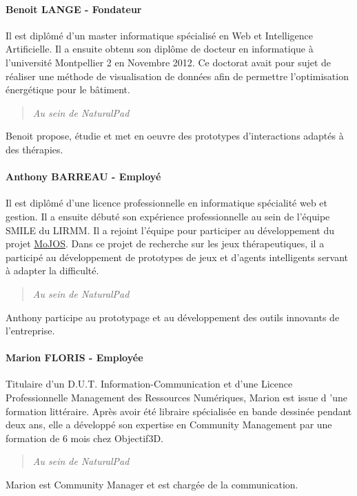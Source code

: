 		\paragraph{Benoit LANGE - Fondateur\\}
Il est diplômé d’un master informatique spécialisé en Web et Intelligence Artificielle. Il a ensuite obtenu son diplôme de docteur en informatique à l’université Montpellier 2 en Novembre 2012. Ce doctorat avait pour sujet de réaliser une méthode de visualisation de données afin de permettre l’optimisation énergétique pour le bâtiment. 
		\begin{quotation} \emph{Au sein de NaturalPad} \end{quotation}
Benoit propose, étudie et met en oeuvre des prototypes d’interactions adaptés à des thérapies.

		\paragraph{Anthony BARREAU - Employé\\}
Il est diplômé d’une licence professionnelle en informatique spécialité web et gestion. Il a ensuite débuté son expérience professionnelle au sein de l’équipe SMILE du LIRMM. Il a rejoint l’équipe pour participer au développement du projet \href{http://www.mojos.fr}{MoJOS}. Dans ce projet de recherche sur les jeux thérapeutiques, il a participé au développement de prototypes de jeux et d’agents intelligents servant à adapter la difficulté. 
		\begin{quotation} \emph{Au sein de NaturalPad} \end{quotation}
Anthony participe au prototypage et au développement des outils innovants de l’entreprise.

		\paragraph{Marion FLORIS - Employée\\}
Titulaire d’un D.U.T. Information-Communication et d’une Licence Professionnelle Management des Ressources Numériques, Marion est issue d ’une formation littéraire. Après avoir été libraire spécialisée en bande dessinée pendant deux ans, elle a développé son expertise en Community Management par une formation de 6 mois chez Objectif3D.
		\begin{quotation} \emph{Au sein de NaturalPad} \end{quotation}
Marion est Community Manager et est chargée de la communication.

